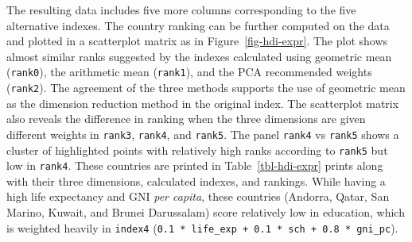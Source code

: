 \documentclass[
]{article}
\begin{document}
The resulting data includes five more columns corresponding to the five
alternative indexes. The country ranking can be further computed on the
data and plotted in a scatterplot matrix as in
Figure~\ref{fig-hdi-expr}. The plot shows almost similar ranks suggested
by the indexes calculated using geometric mean (\texttt{rank0}), the
arithmetic mean (\texttt{rank1}), and the PCA recommended weights
(\texttt{rank2}). The agreement of the three methods supports the use of
geometric mean as the dimension reduction method in the original index.
The scatterplot matrix also reveals the difference in ranking when the
three dimensions are given different weights in \texttt{rank3},
\texttt{rank4}, and \texttt{rank5}. The panel \texttt{rank4} vs
\texttt{rank5} shows a cluster of highlighted points with relatively
high ranks according to \texttt{rank5} but low in \texttt{rank4}. These
countries are printed in Table~\ref{tbl-hdi-expr} prints along with
their three dimensions, calculated indexes, and rankings. While having a
high life expectancy and GNI \emph{per capita}, these countries
(Andorra, Qatar, San Marino, Kuwait, and Brunei Darussalam) score
relatively low in education, which is weighted heavily in
\texttt{index4}
(\texttt{0.1\ *\ life\_exp\ +\ 0.1\ *\ sch\ +\ 0.8\ *\ gni\_pc}).
\end{document}
